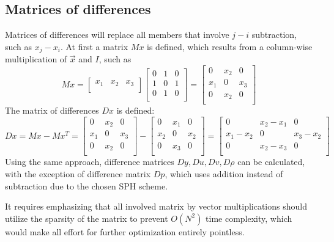 \documentclass{article}
\begin{document}
\subsection{Matrices of differences} \label{matrices of differences}
Matrices of differences will replace all members that involve $j-i$ subtraction, such as $x_j-x_i$.
At first a matrix $Mx$ is defined, which results from a column-wise multiplication of $\Vec{x}$ and $I$, such as
$$
Mx=
\begin{bmatrix}
x_1 & x_2 & x_3\\
\end{bmatrix}
\begin{bmatrix}
0 & 1 & 0\\
1 & 0 & 1\\
0 & 1 & 0\\
\end{bmatrix}
=
\begin{bmatrix}
0 & x_2 & 0\\
x_1 & 0 & x_3\\
0 & x_2 & 0\\
\end{bmatrix}
$$
The matrix of differences $Dx$ is defined:
$$
Dx=Mx-Mx^T=
\begin{bmatrix}
0 & x_2 & 0\\
x_1 & 0 & x_3\\
0 & x_2 & 0\\
\end{bmatrix}
-
\begin{bmatrix}
0 & x_1 & 0\\
x_2 & 0 & x_2\\
0 & x_3 & 0\\
\end{bmatrix}
=
\begin{bmatrix}
0 & x_2-x_1 & 0\\
x_1-x_2 & 0 & x_3-x_2\\
0 & x_2-x_3 & 0\\
\end{bmatrix}
$$
Using the same approach, difference matrices $Dy, Du, Dv, D\rho$ can be calculated, with the exception of difference matrix $Dp$, which uses addition instead of subtraction due to the chosen SPH scheme.

It requires emphasizing that all involved matrix by vector multiplications should utilize the sparsity of the matrix to prevent $O(N^2)$ time complexity, which would make all effort for further optimization entirely pointless.
\end{document}

